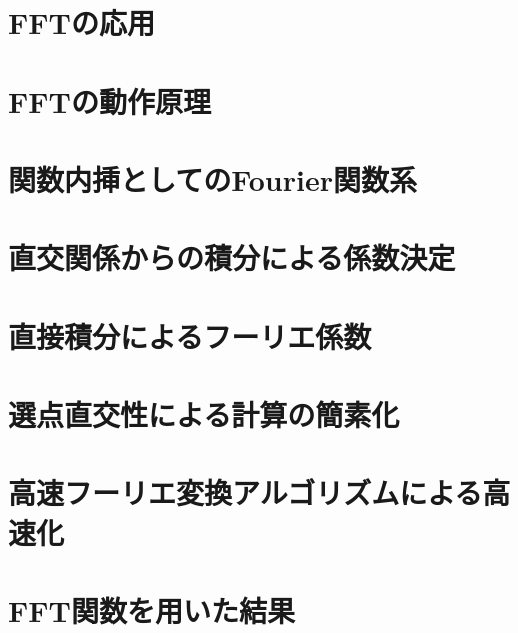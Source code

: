 \documentclass[10pt,a4j]{jsbook}
\begin{document}
\section{FFTの応用}
 
\section{FFTの動作原理}
 
\section{関数内挿としてのFourier関数系}
 
\section{直交関係からの積分による係数決定}
 
\section{直接積分によるフーリエ係数}
 
\section{選点直交性による計算の簡素化}
 
\section{高速フーリエ変換アルゴリズムによる高速化}
 
\section{FFT関数を用いた結果}
 
\end{document}
